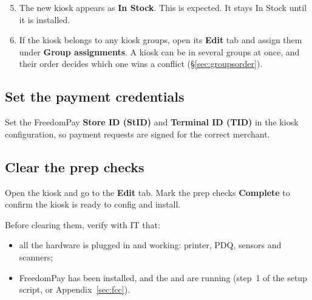 \documentclass[a4paper,10pt]{article}
\begin{document}

\begin{enumerate}\setcounter{enumi}{4}
  \item The new kiosk appears as \textbf{In Stock}. This is expected.
        It stays In Stock until it is installed.

  \item If the kiosk belongs to any kiosk groups, open its \textbf{Edit}
        tab and assign them under \textbf{Group assignments}. A kiosk can
        be in several groups at once, and their order decides which one
        wins a conflict (\S\ref{sec:groupsorder}).
\end{enumerate}


\subsection{Set the payment credentials}\label{sec:payment}

Set the FreedomPay \textbf{Store ID (StID)} and \textbf{Terminal ID
(TID)} in the kiosk configuration, so payment requests are signed for the
correct merchant.

\subsection{Clear the prep checks}

Open the kiosk and go to the \textbf{Edit} tab. Mark the prep checks
\textbf{Complete} to confirm the kiosk is ready to config and install.


Before clearing them, verify with IT that:

\begin{itemize}
  \item all the hardware is plugged in and working: printer, PDQ,
        sensors and scanners;
  \item FreedomPay has been installed, and the
         and  are
        running (step~1 of the setup script, or Appendix~\ref{sec:fcc}).
\end{itemize}
\end{document}

